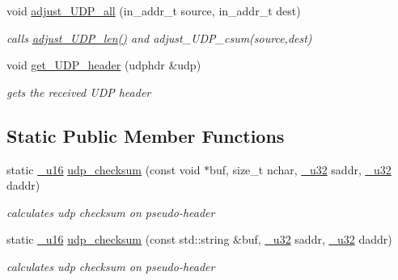 \begin{CompactItemize}
void \hyperlink{classsocketpp_1_1UDP__RawSocket_4fe2e6b184ca8f8248a187df30e12fd2}{adjust\_\-UDP\_\-all} (in\_\-addr\_\-t source, in\_\-addr\_\-t dest)
\begin{CompactList}\small\item\em calls \hyperlink{classsocketpp_1_1UDP__RawSocket_1caa413cfe4f72d8c0aeccdcb10469b5}{adjust\_\-UDP\_\-len()} and adjust\_\-UDP\_\-csum(source,dest) \item\end{CompactList}\item 
void \hyperlink{classsocketpp_1_1UDP__RawSocket_597a30fc537dce06c85663add29defdc}{get\_\-UDP\_\-header} (udphdr \&udp)
\begin{CompactList}\small\item\em gets the received UDP header \item\end{CompactList}\end{CompactItemize}
\subsection*{Static Public Member Functions}
\begin{CompactItemize}
\item 
static \hyperlink{namespacesocketpp_0d48e817f00cbb84d07faec41ee4b169}{\_\-u16} \hyperlink{classsocketpp_1_1UDP__RawSocket_fdc782d0436fd9c6d24520034d445063}{udp\_\-checksum} (const void $\ast$buf, size\_\-t nchar, \hyperlink{namespacesocketpp_d9c3b2ad093bb5814af59760e0a2192a}{\_\-u32} saddr, \hyperlink{namespacesocketpp_d9c3b2ad093bb5814af59760e0a2192a}{\_\-u32} daddr)
\begin{CompactList}\small\item\em calculates udp checksum on pseudo-header \item\end{CompactList}\item 
static \hyperlink{namespacesocketpp_0d48e817f00cbb84d07faec41ee4b169}{\_\-u16} \hyperlink{classsocketpp_1_1UDP__RawSocket_166b30d9061b06336dc637cd3a25d12f}{udp\_\-checksum} (const std::string \&buf, \hyperlink{namespacesocketpp_d9c3b2ad093bb5814af59760e0a2192a}{\_\-u32} saddr, \hyperlink{namespacesocketpp_d9c3b2ad093bb5814af59760e0a2192a}{\_\-u32} daddr)
\begin{CompactList}\small\item\em calculates udp checksum on pseudo-header \item\end{CompactList}\end{CompactItemize}

